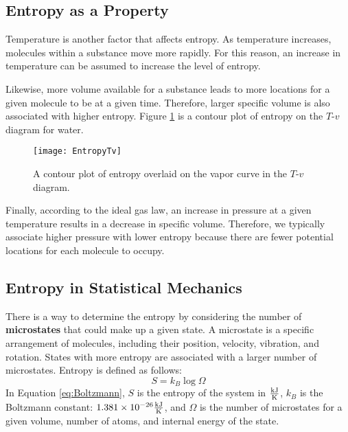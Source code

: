 \subsection{Entropy as a Property}

Temperature is another factor that affects entropy. As temperature increases, molecules within a substance move more rapidly.  For this reason, an increase in temperature can be assumed to increase the level of entropy.

Likewise, more volume available for a substance leads to more locations for a given molecule to be at a given time.  Therefore, larger specific volume is also associated with higher entropy.  Figure \ref{fig:EntropyTv} is a contour plot of entropy on the $T$-$v$ diagram for water.

\begin{figure}[H]
  \centering
  \texttt{[image: EntropyTv]}
  \caption{A contour plot of entropy overlaid on the vapor curve in the $T$-$v$ diagram.}
  \label{fig:EntropyTv}
\end{figure}%

Finally, according to the ideal gas law, an increase in pressure at a given temperature results in a decrease in specific volume. Therefore, we typically associate higher pressure with lower entropy because there are fewer potential locations for each molecule to occupy.

\subsection{Entropy in Statistical Mechanics}

There is a way to determine the entropy by considering the number of {\bf microstates} that could make up a given state.  A microstate is a specific arrangement of molecules, including their position, velocity, vibration, and rotation.  States with more entropy are associated with a larger number of microstates.  Entropy is defined as follows:
\begin{equation}\label{eq:Boltzmann}
  S = k_B \log \Omega
\end{equation}
In Equation \ref{eq:Boltzmann}, $S$ is the entropy of the system in $\frac{\rm kJ}{\rm K}$, $k_B$ is the Boltzmann constant: $1.381\times 10^{-26}\frac{\rm kJ}{\rm K}$, and $\Omega$ is the number of microstates for a given volume, number of atoms, and internal energy of the state.

